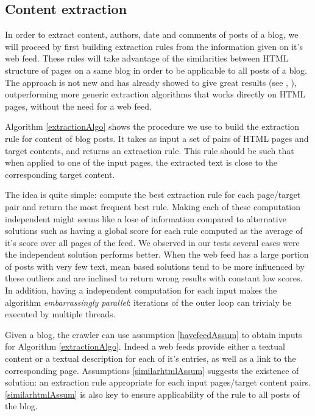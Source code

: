 \subsection{Content extraction}
%
In order to extract content, authors, date and comments of posts of a blog, we will proceed by first building extraction rules from the information given on it's web feed. These rules will take advantage of the similarities between HTML structure of pages on a same blog in order to be applicable to all posts of a blog. The approach is not new and has already showed to give great results (see \cite{gkotsis2013}, \cite{oita2010}), outperforming more generic extraction algorithms that works directly on HTML pages, without the need for a web feed.

\extractionAlgo

%
Algorithm \ref{extractionAlgo} shows the procedure we use to build the extraction rule for content of blog posts. It takes as input a set of pairs of HTML pages and target contents, and returns an extraction rule. This rule should be such that when applied to one of the input pages, the extracted text is close to the corresponding target content.

%
The idea is quite simple: compute the best extraction rule for each page/target pair and return the most frequent best rule. Making each of these computation independent might seems like a lose of information compared to alternative solutions such as having a global score for each rule computed as the average of it's score over all pages of the feed. We observed in our tests several cases were the independent solution performs better. When the web feed has a large portion of posts with very few text, mean based solutions tend to be more influenced by these outliers and are inclined to return wrong results with constant low scores. In addition, having a independent computation for each input makes the algorithm \emph{embarrassingly parallel}: iterations of the outer loop can trivialy be executed by multiple threads.

%
Given a blog, the crawler can use assumption \ref{havefeedAssum} to obtain inputs for Algorithm \ref{extractionAlgo}. Indeed a web feeds provide either a textual content or a textual description for each of it's entries, as well as a link to the corresponding page. Assumptions \ref{similarhtmlAssum} suggests the existence of solution: an extraction rule appropriate for each input pages/target content pairs. \ref{similarhtmlAssum} is also key to ensure applicability of the rule to all posts of the blog.

